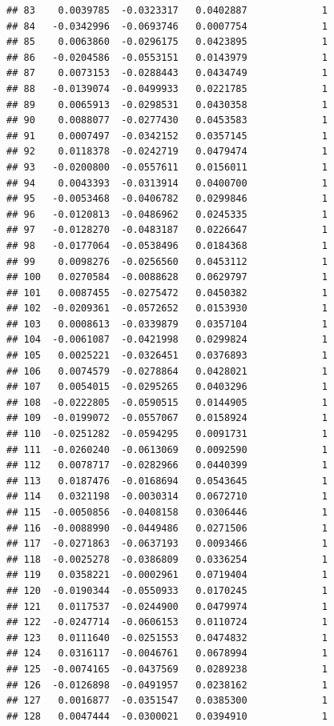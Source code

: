 \documentclass[12pt]{article}\usepackage[]{graphicx}\usepackage[]{xcolor}
\makeatletter
\newenvironment{kframe}{%
 \def\at@end@of@kframe{}%
 \ifinner\ifhmode%
  \def\at@end@of@kframe{\end{minipage}}%
  \begin{minipage}{\columnwidth}%
 \fi\fi%
 \def\FrameCommand##1{\hskip\@totalleftmargin \hskip-\fboxsep
 \colorbox{shadecolor}{##1}\hskip-\fboxsep
     \hskip-\linewidth \hskip-\@totalleftmargin \hskip\columnwidth}%
 \MakeFramed {\advance\hsize-\width
   \@totalleftmargin\z@ \linewidth\hsize
   \@setminipage}}%
 {\par\unskip\endMakeFramed%
 \at@end@of@kframe}
\newenvironment{knitrout}{}{} %
\makeatother
\begin{document}
\begin{knitrout}
\begin{kframe}
\begin{verbatim}
## 83    0.0039785  -0.0323317   0.0402887             1
## 84   -0.0342996  -0.0693746   0.0007754             1
## 85    0.0063860  -0.0296175   0.0423895             1
## 86   -0.0204586  -0.0553151   0.0143979             1
## 87    0.0073153  -0.0288443   0.0434749             1
## 88   -0.0139074  -0.0499933   0.0221785             1
## 89    0.0065913  -0.0298531   0.0430358             1
## 90    0.0088077  -0.0277430   0.0453583             1
## 91    0.0007497  -0.0342152   0.0357145             1
## 92    0.0118378  -0.0242719   0.0479474             1
## 93   -0.0200800  -0.0557611   0.0156011             1
## 94    0.0043393  -0.0313914   0.0400700             1
## 95   -0.0053468  -0.0406782   0.0299846             1
## 96   -0.0120813  -0.0486962   0.0245335             1
## 97   -0.0128270  -0.0483187   0.0226647             1
## 98   -0.0177064  -0.0538496   0.0184368             1
## 99    0.0098276  -0.0256560   0.0453112             1
## 100   0.0270584  -0.0088628   0.0629797             1
## 101   0.0087455  -0.0275472   0.0450382             1
## 102  -0.0209361  -0.0572652   0.0153930             1
## 103   0.0008613  -0.0339879   0.0357104             1
## 104  -0.0061087  -0.0421998   0.0299824             1
## 105   0.0025221  -0.0326451   0.0376893             1
## 106   0.0074579  -0.0278864   0.0428021             1
## 107   0.0054015  -0.0295265   0.0403296             1
## 108  -0.0222805  -0.0590515   0.0144905             1
## 109  -0.0199072  -0.0557067   0.0158924             1
## 110  -0.0251282  -0.0594295   0.0091731             1
## 111  -0.0260240  -0.0613069   0.0092590             1
## 112   0.0078717  -0.0282966   0.0440399             1
## 113   0.0187476  -0.0168694   0.0543645             1
## 114   0.0321198  -0.0030314   0.0672710             1
## 115  -0.0050856  -0.0408158   0.0306446             1
## 116  -0.0088990  -0.0449486   0.0271506             1
## 117  -0.0271863  -0.0637193   0.0093466             1
## 118  -0.0025278  -0.0386809   0.0336254             1
## 119   0.0358221  -0.0002961   0.0719404             1
## 120  -0.0190344  -0.0550933   0.0170245             1
## 121   0.0117537  -0.0244900   0.0479974             1
## 122  -0.0247714  -0.0606153   0.0110724             1
## 123   0.0111640  -0.0251553   0.0474832             1
## 124   0.0316117  -0.0046761   0.0678994             1
## 125  -0.0074165  -0.0437569   0.0289238             1
## 126  -0.0126898  -0.0491957   0.0238162             1
## 127   0.0016877  -0.0351547   0.0385300             1
## 128   0.0047444  -0.0300021   0.0394910             1

\end{verbatim}
\end{kframe}
\end{knitrout}
\end{document}
